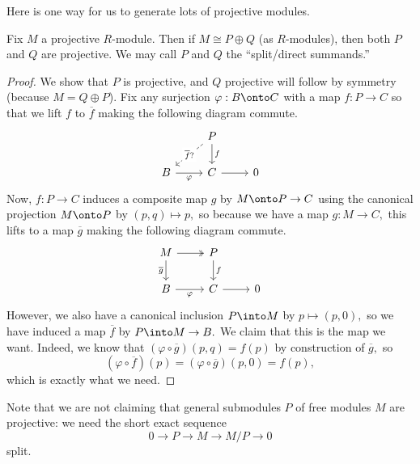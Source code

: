 \documentclass[../notes.tex]{subfiles}
\begin{document}
Here is one way for us to generate lots of projective modules.
\begin{proposition} \label{prop:splitprojectivesum}
	Fix $M$ a projective $R$-module. Then if $M\cong P\oplus Q$ (as $R$-modules), then both $P$ and $Q$ are projective. We may call $P$ and $Q$ the ``split/direct summands.''
\end{proposition}
\begin{proof}
	We show that $P$ is projective, and $Q$ projective will follow by symmetry (because $M=Q\oplus P$). Fix any surjection $\varphi:B\onto C$ with a map $f:P\to C$ so that we lift $f$ to $\overline f$ making the following diagram commute.
	\[\begin{tikzcd}
		& P \\
		B & C & 0
		\arrow["\varphi"', from=2-1, to=2-2]
		\arrow[from=2-2, to=2-3]
		\arrow["f", from=1-2, to=2-2]
		\arrow["{\overline f}?"{description}, dashed, from=1-2, to=2-1]
	\end{tikzcd}\]
	Now, $f:P\to C$ induces a composite map $g$ by $M\onto P\to C$ using the canonical projection $M\onto P$ by $(p,q)\mapsto p,$ so because we have a map $g:M\to C,$ this lifts to a map $\overline g$ making the following diagram commute.
	\[\begin{tikzcd}
		M & P \\
		B & C & 0
		\arrow["\varphi"', from=2-1, to=2-2]
		\arrow[from=2-2, to=2-3]
		\arrow["f", from=1-2, to=2-2]
		\arrow[two heads, from=1-1, to=1-2]
		\arrow["{\overline g}"', from=1-1, to=2-1]
	\end{tikzcd}\]
	However, we also have a canonical inclusion $P\into M$ by $p\mapsto(p,0),$ so we have induced a map $\overline f$ by $P\into M\to B.$ We claim that this is the map we want. Indeed, we know that $(\varphi\circ\overline g)(p,q)=f(p)$ by construction of $\overline g,$ so
	\[(\varphi\circ\overline f)(p)=(\varphi\circ\overline g)(p,0)=f(p),\]
	which is exactly what we need.
\end{proof}
Note that we are not claiming that general submodules $P$ of free modules $M$ are projective: we need the short exact sequence
\[0\to P\to M\to M/P\to 0\]
split.
\end{document}
